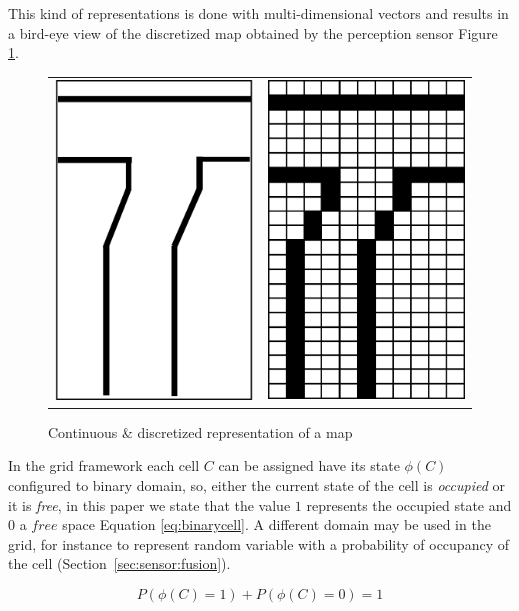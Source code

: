 This kind of representations is done with multi-dimensional vectors and results in a bird-eye view of the discretized map obtained by the perception sensor Figure \ref{fig:grid:continuous:discretized}.

\begin{figure}[h]
\centering
	\begin{tabular}{lr}\\
		\includegraphics[width=0.25\columnwidth]{img/fig:grid:continuous} &
		\includegraphics[width=0.25\columnwidth]{img/fig:grid:discretized}
	\end{tabular}
	\caption{Continuous \& discretized representation of a map}
	\label{fig:grid:continuous:discretized}
\end{figure}

In the grid framework each cell $C$ can be assigned have its state $\phi(C)$ configured to binary domain, so, either the current state of the cell is \textit{occupied} or it is \textit{free}, in this paper we state that the value $1$ represents the occupied state and $0$ a $free$ space Equation \ref{eq:binarycell}. A different domain may be used in the grid, for instance to represent random variable with a probability of occupancy of the cell (Section~\ref{sec:sensor:fusion}).

\begin{equation}
P(\phi(C)=1) + P(\phi(C)=0) = 1
\label{eq:binarycell}
\end{equation}

